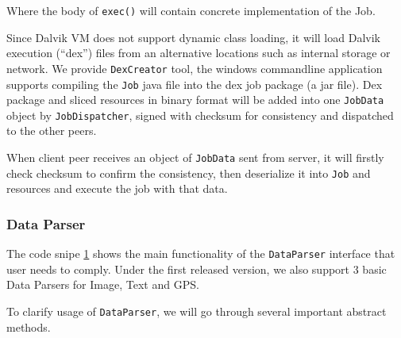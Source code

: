\documentclass[conference]{IEEEtran}
\begin{document}
Where the body of \texttt{exec()} will contain concrete implementation of the Job.

Since Dalvik VM does not support dynamic class loading, it will load Dalvik execution (``dex'') files from an alternative locations such as internal storage or network. We provide \texttt{DexCreator} tool, the windows commandline application supports compiling the \texttt{Job} java file into the dex job package (a jar file). Dex package and sliced resources in binary format will be added into one \texttt{JobData} object by \texttt{JobDispatcher}, signed with checksum for consistency and dispatched to the other peers.

When client peer receives an object of \texttt{JobData} sent from server, it will firstly check checksum to confirm the consistency, then deserialize it into \texttt{Job} and resources and execute the job with that data.

\subsubsection{Data Parser}
The code snipe \ref{data_parser} shows the main functionality of the \texttt{DataParser} interface that user needs to comply. Under the first released version, we also support 3 basic Data Parsers for Image, Text and GPS.\\

\begin{figure}
\noindent {}	
  \label{data_parser}
\end{figure}

To clarify usage of \texttt{DataParser}, we will go through several important abstract methods.
\end{document}
